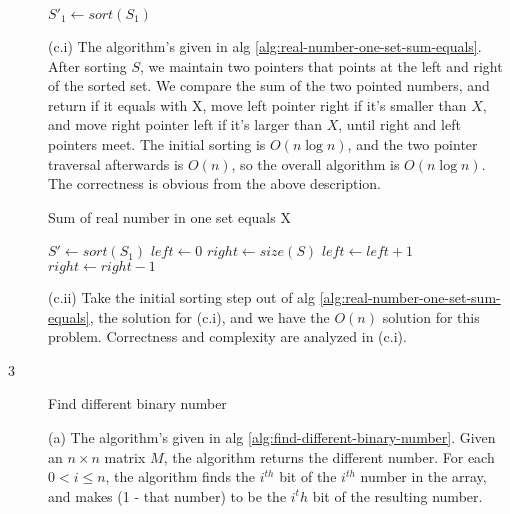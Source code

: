 \documentclass{article}
\begin{document}
\begin{description}
\begin{algorithm}[H]
\begin{algorithmic}[1]
      \State $S'_1 \gets sort(S_1)$
          \State {}
        \EndIf
      \EndFor
      \State {}
    \EndFunction

    \end{algorithmic}
  \end{algorithm}

  (c.i) The algorithm's given in alg \ref{alg:real-number-one-set-sum-equals}. After sorting $S$, we maintain two pointers that points at the left and right of the sorted set. We compare the sum of the two pointed numbers, and return if it equals with X, move left pointer right if it's smaller than $X$, and move right pointer left if it's larger than $X$, until right and left pointers meet. The initial sorting is $O(n \log n)$, and the two pointer traversal afterwards is $O(n)$, so the overall algorithm is $O(n \log n)$. The correctness is obvious from the above description.

  \begin{algorithm}[H]
  \caption{Sum of real number in one set equals X}
  \label{alg:real-number-one-set-sum-equals}
    \begin{algorithmic}[1]
    
      \State $S' \gets sort(S_1)$
      \State $left \gets 0$
      \State $right \gets size(S)$
          \State {}
          \State $left \gets left + 1$
        \Else
          \State $right \gets right - 1$
        \EndIf
      \EndWhile
      \State {}
    \EndFunction

    \end{algorithmic}
  \end{algorithm}

  (c.ii) Take the initial sorting step out of alg \ref{alg:real-number-one-set-sum-equals}, the solution for (c.i), and we have the $O(n)$ solution for this problem. Correctness and complexity are analyzed in (c.i).

\item[3]{Find different binary number}
 
  (a) The algorithm's given in alg \ref{alg:find-different-binary-number}. Given an $n \times n$ matrix $M$, the algorithm returns the different number. For each $0 < i \leq n$, the algorithm finds the $i^{th}$ bit of the $i^{th}$ number in the array, and makes (1 - that number) to be the $i^th$ bit of the resulting number. 


\end{description}
\end{document}
